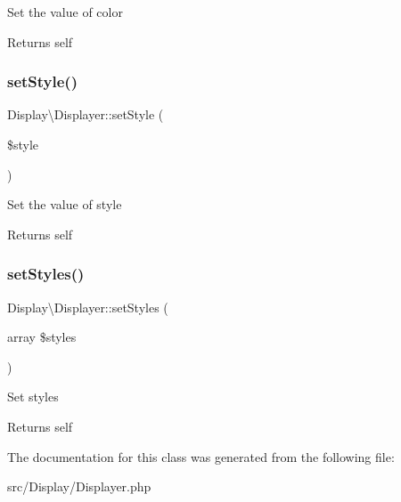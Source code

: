 Set the value of color

\begin{DoxyReturn}{Returns}
self 
\end{DoxyReturn}
\mbox{\label{classDisplay_1_1Displayer_ab9ba6574d40f5ecd249e461ac7e376b5}} 
\subsubsection{\texorpdfstring{set\+Style()}{setStyle()}}
{\footnotesize\ttfamily Display\textbackslash{}\+Displayer\+::set\+Style (\begin{DoxyParamCaption}\item[{}]{\$style }\end{DoxyParamCaption})}

Set the value of style

\begin{DoxyReturn}{Returns}
self 
\end{DoxyReturn}
\mbox{\label{classDisplay_1_1Displayer_a2f6f5f0314cdb53ea96baa7dda489154}} 
\subsubsection{\texorpdfstring{set\+Styles()}{setStyles()}}
{\footnotesize\ttfamily Display\textbackslash{}\+Displayer\+::set\+Styles (\begin{DoxyParamCaption}\item[{array}]{\$styles }\end{DoxyParamCaption})}

Set styles

\begin{DoxyReturn}{Returns}
self 
\end{DoxyReturn}


The documentation for this class was generated from the following file\+:\begin{DoxyCompactItemize}
\item 
src/\+Display/Displayer.\+php\end{DoxyCompactItemize}
